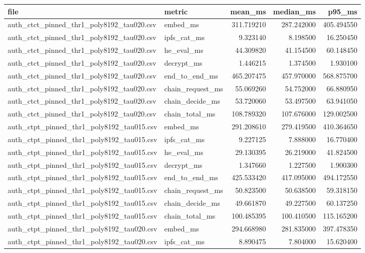 \begin{tabular}{llrrr}
\toprule
file & metric & mean_ms & median_ms & p95_ms \\
\midrule
auth_ctct_pinned_thr1_poly8192_tau020.csv & embed_ms & 311.719210 & 287.242000 & 405.494550 \\
auth_ctct_pinned_thr1_poly8192_tau020.csv & ipfs_cat_ms & 9.323140 & 8.198500 & 16.250450 \\
auth_ctct_pinned_thr1_poly8192_tau020.csv & he_eval_ms & 44.309820 & 41.154500 & 60.148450 \\
auth_ctct_pinned_thr1_poly8192_tau020.csv & decrypt_ms & 1.446215 & 1.374500 & 1.930100 \\
auth_ctct_pinned_thr1_poly8192_tau020.csv & end_to_end_ms & 465.207475 & 457.970000 & 568.875700 \\
auth_ctct_pinned_thr1_poly8192_tau020.csv & chain_request_ms & 55.069260 & 54.752000 & 66.880950 \\
auth_ctct_pinned_thr1_poly8192_tau020.csv & chain_decide_ms & 53.720060 & 53.497500 & 63.941050 \\
auth_ctct_pinned_thr1_poly8192_tau020.csv & chain_total_ms & 108.789320 & 107.676000 & 129.002500 \\
auth_ctpt_pinned_thr1_poly8192_tau015.csv & embed_ms & 291.208610 & 279.419500 & 410.364650 \\
auth_ctpt_pinned_thr1_poly8192_tau015.csv & ipfs_cat_ms & 9.227125 & 7.888000 & 16.770400 \\
auth_ctpt_pinned_thr1_poly8192_tau015.csv & he_eval_ms & 29.130395 & 26.219000 & 41.824500 \\
auth_ctpt_pinned_thr1_poly8192_tau015.csv & decrypt_ms & 1.347660 & 1.227500 & 1.900300 \\
auth_ctpt_pinned_thr1_poly8192_tau015.csv & end_to_end_ms & 425.533420 & 417.095000 & 494.172550 \\
auth_ctpt_pinned_thr1_poly8192_tau015.csv & chain_request_ms & 50.823500 & 50.638500 & 59.318150 \\
auth_ctpt_pinned_thr1_poly8192_tau015.csv & chain_decide_ms & 49.661870 & 49.227500 & 60.137250 \\
auth_ctpt_pinned_thr1_poly8192_tau015.csv & chain_total_ms & 100.485395 & 100.410500 & 115.165200 \\
auth_ctpt_pinned_thr1_poly8192_tau020.csv & embed_ms & 294.668980 & 281.835000 & 397.478350 \\
auth_ctpt_pinned_thr1_poly8192_tau020.csv & ipfs_cat_ms & 8.890475 & 7.804000 & 15.620400 \\

\end{tabular}
